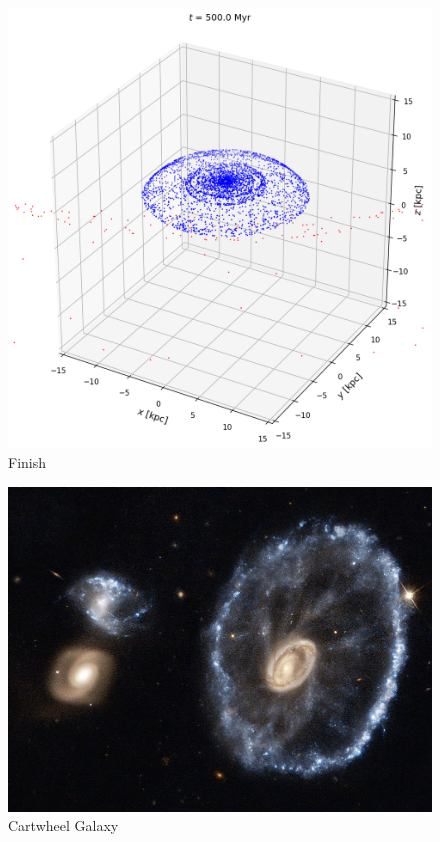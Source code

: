 \documentclass[linenumbers,RNAAS,trackchanges]{aastex631}
\begin{document}
\begin{figure}[H]
    \centering
    \includegraphics[scale=.40]{cartwheel.png}
    \caption{Finish}
    \label{fig:code}
\end{figure}
\begin{figure}[H]
    \centering
    \includegraphics[scale=.5]{cartwheel.jpeg}
    \caption{Cartwheel Galaxy}
    \label{fig:code}
\end{figure}
\end{document}
